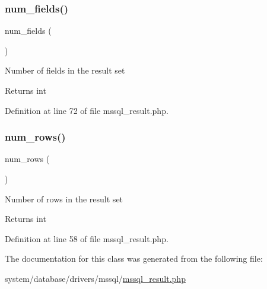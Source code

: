 \mbox{\label{class_c_i___d_b__mssql__result_af831bf363e4d7d661a717a4932af449d}} 
\subsubsection{\texorpdfstring{num\_fields()}{num\_fields()}}
{\footnotesize\ttfamily num\+\_\+fields (\begin{DoxyParamCaption}{ }\end{DoxyParamCaption})}

Number of fields in the result set

\begin{DoxyReturn}{Returns}
int 
\end{DoxyReturn}


Definition at line 72 of file mssql\+\_\+result.\+php.

\mbox{\label{class_c_i___d_b__mssql__result_a218657c303ee499b97710ab0cd2f5d6e}} 
\subsubsection{\texorpdfstring{num\_rows()}{num\_rows()}}
{\footnotesize\ttfamily num\+\_\+rows (\begin{DoxyParamCaption}{ }\end{DoxyParamCaption})}

Number of rows in the result set

\begin{DoxyReturn}{Returns}
int 
\end{DoxyReturn}


Definition at line 58 of file mssql\+\_\+result.\+php.



The documentation for this class was generated from the following file\+:\begin{DoxyCompactItemize}
\item 
system/database/drivers/mssql/\mbox{\hyperlink{mssql__result_8php}{mssql\+\_\+result.\+php}}\end{DoxyCompactItemize}
